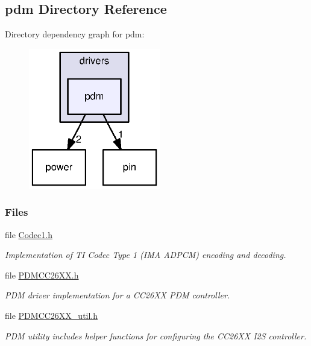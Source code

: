 \subsection{pdm Directory Reference}
\label{dir_b1ddec926d36b83563ca40cdb4cc7809}
Directory dependency graph for pdm\+:
\nopagebreak
\begin{figure}[H]
\begin{center}
\leavevmode
\includegraphics[width=163pt]{dir_b1ddec926d36b83563ca40cdb4cc7809_dep}
\end{center}
\end{figure}
\subsubsection*{Files}
\begin{DoxyCompactItemize}
\item 
file \hyperlink{_codec1_8h}{Codec1.\+h}
\begin{DoxyCompactList}\small\item\em Implementation of T\+I Codec Type 1 (I\+M\+A A\+D\+P\+C\+M) encoding and decoding. \end{DoxyCompactList}\item 
file \hyperlink{_p_d_m_c_c26_x_x_8h}{P\+D\+M\+C\+C26\+X\+X.\+h}
\begin{DoxyCompactList}\small\item\em P\+D\+M driver implementation for a C\+C26\+X\+X P\+D\+M controller. \end{DoxyCompactList}\item 
file \hyperlink{_p_d_m_c_c26_x_x__util_8h}{P\+D\+M\+C\+C26\+X\+X\+\_\+util.\+h}
\begin{DoxyCompactList}\small\item\em P\+D\+M utility includes helper functions for configuring the C\+C26\+X\+X I2\+S controller. \end{DoxyCompactList}\end{DoxyCompactItemize}
